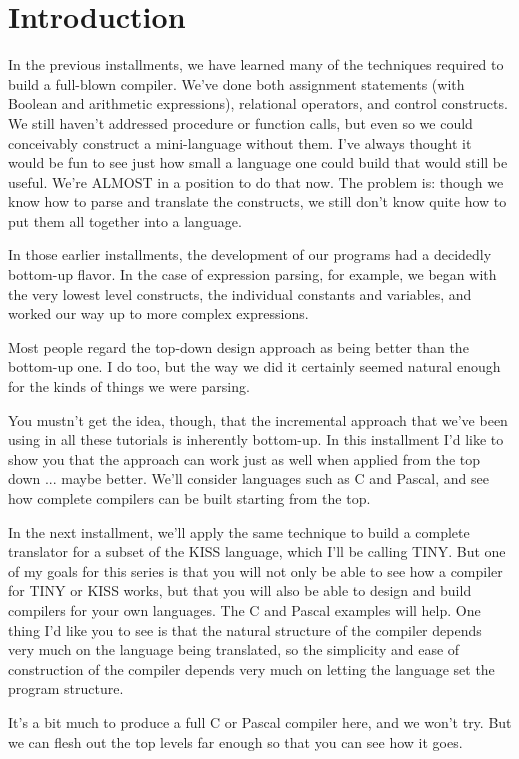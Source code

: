 \documentclass[float=false, crop=false]{standalone}
\begin{document}
\section{Introduction}

In the previous installments, we have learned many of the techniques required to
build a full-blown compiler. We've done both assignment statements (with Boolean
and arithmetic expressions), relational operators, and control constructs. We
still haven't addressed procedure or function calls, but even so we could
conceivably construct a mini-language without them. I've always thought it would
be fun to see just how small a language one could build that would still be
useful. We're ALMOST in a position to do that now. The problem is: though we
know how to parse and translate the constructs, we still don't know quite how to
put them all together into a language.

In those earlier installments, the development of our programs had a decidedly
bottom-up flavor. In the case of expression parsing, for example, we began with
the very lowest level constructs, the individual constants and variables, and
worked our way up to more complex expressions.

Most people regard the top-down design approach as being better than the
bottom-up one. I do too, but the way we did it certainly seemed natural enough
for the kinds of things we were parsing.

You mustn't get the idea, though, that the incremental approach that we've been
using in all these tutorials is inherently bottom-up. In this installment I'd
like to show you that the approach can work just as well when applied from the
top down ... maybe better. We'll consider languages such as C and Pascal, and
see how complete compilers can be built starting from the top.

In the next installment, we'll apply the same technique to build a complete
translator for a subset of the KISS language, which I'll be calling TINY. But
one of my goals for this series is that you will not only be able to see how a
compiler for TINY or KISS works, but that you will also be able to design and
build compilers for your own languages. The C and Pascal examples will help. One
thing I'd like you to see is that the natural structure of the compiler depends
very much on the language being translated, so the simplicity and ease of
construction of the compiler depends very much on letting the language set the
program structure.

It's a bit much to produce a full C or Pascal compiler here, and we won't try.
But we can flesh out the top levels far enough so that you can see how it goes.
\end{document}
